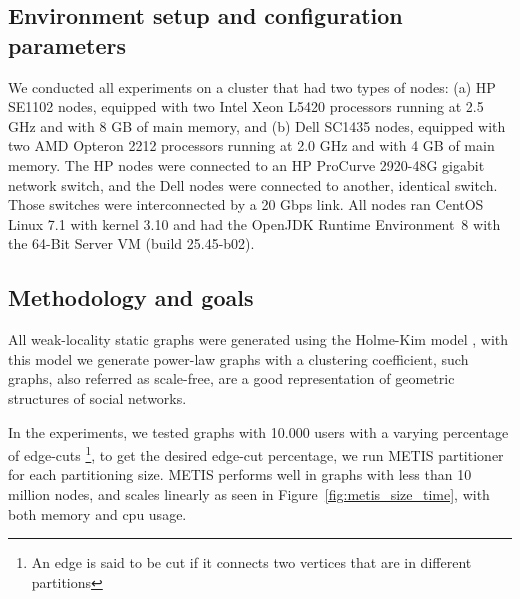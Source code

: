 \subsection{Environment setup and configuration parameters}
\label{sec:evaluation:setup}

We conducted all experiments on a cluster that had two types of nodes: (a) HP SE1102 nodes, equipped with two Intel Xeon L5420 processors running at 2.5 GHz and with 8 GB of main memory, and (b) Dell SC1435 nodes, equipped with two AMD Opteron 2212 processors running at 2.0 GHz and with 4 GB of main memory. The HP nodes were connected to an HP ProCurve 2920-48G gigabit network switch, and the Dell nodes were connected to another, identical switch. Those switches were interconnected by a 20 Gbps link.
All nodes ran CentOS Linux 7.1 with kernel 3.10 and had the OpenJDK Runtime Environment~8 with the \mbox{64-Bit} Server VM (build 25.45-b02).


\subsection{Methodology and goals}
\label{sec:evaluation:methodology}
All weak-locality static graphs were generated using the Holme-Kim model \cite{holme-kim}, with this model we generate
power-law graphs with a clustering coefficient, such graphs, also referred as scale-free, are a good representation
of geometric structures of social networks.

In the experiments, we tested graphs with 10.000 users with a varying percentage of edge-cuts \footnote{An edge is said to be cut if it connects two vertices that are in different partitions}, to get the desired edge-cut
percentage, we run METIS partitioner for each partitioning size. METIS performs well in graphs with less than 10 million nodes, and scales linearly as seen in Figure~\ref{fig:metis_size_time}, with both memory and cpu usage.

